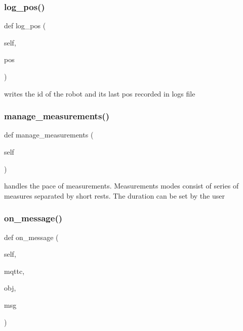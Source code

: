 \subsubsection{\texorpdfstring{log\+\_\+pos()}{log\_pos()}}
{\footnotesize\ttfamily def log\+\_\+pos (\begin{DoxyParamCaption}\item[{}]{self,  }\item[{}]{pos }\end{DoxyParamCaption})}

\begin{DoxyVerb}writes the id of the robot and its last pos recorded in logs file\end{DoxyVerb}
 \mbox{\label{classapplication_1_1_application_aadd900346b1bd5c962657a1566f9fbb7}} 
\subsubsection{\texorpdfstring{manage\+\_\+measurements()}{manage\_measurements()}}
{\footnotesize\ttfamily def manage\+\_\+measurements (\begin{DoxyParamCaption}\item[{}]{self }\end{DoxyParamCaption})}

\begin{DoxyVerb}handles the pace of measurements. Measurements modes consist of series of measures separated by short rests.
The duration can be set by the user\end{DoxyVerb}
 \mbox{\label{classapplication_1_1_application_ac8badcf7fda4f70c2c93bfe0e55edcb3}} 
\subsubsection{\texorpdfstring{on\+\_\+message()}{on\_message()}}
{\footnotesize\ttfamily def on\+\_\+message (\begin{DoxyParamCaption}\item[{}]{self,  }\item[{}]{mqttc,  }\item[{}]{obj,  }\item[{}]{msg }\end{DoxyParamCaption})}

